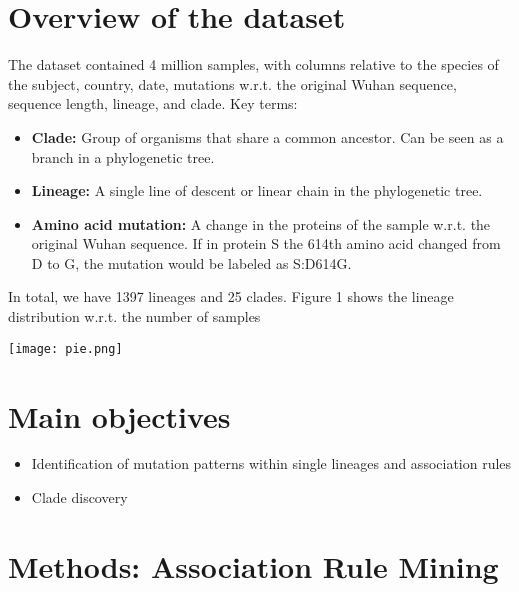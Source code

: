 \documentclass[a0,landscape]{a0poster}
\begin{document}
\begin{multicols}{4}
		\section*{Overview of the dataset}
		The dataset contained 4 million samples, with columns relative to the species of the subject, country, date, mutations w.r.t. the original Wuhan sequence, sequence length, lineage, and clade. Key terms:
		\begin{itemize}
			\item \textbf{Clade: }Group of organisms that share a common ancestor. Can be seen as a branch in a phylogenetic tree.
			\item \textbf{Lineage: } A single line of descent or linear chain in the phylogenetic tree.
			\item \textbf{Amino acid mutation: } A change in the proteins of the sample w.r.t. the original Wuhan sequence. If in protein S the 614th amino acid changed from D to G, the mutation would be labeled as S:D614G.
		\end{itemize}
		In total, we have 1397 lineages and 25 clades. Figure 1 shows the lineage distribution w.r.t. the number of samples
		\begin{center}\vspace{1cm}
			\texttt{[image: pie.png]}
		\end{center}\vspace{1cm}
		\section*{Main objectives}
		\begin{itemize}
			\item Identification of mutation patterns within single lineages and association rules
			\item Clade discovery
		\end{itemize}
		
		
		\section*{Methods: Association Rule Mining}
		

\end{multicols}
\end{document}
